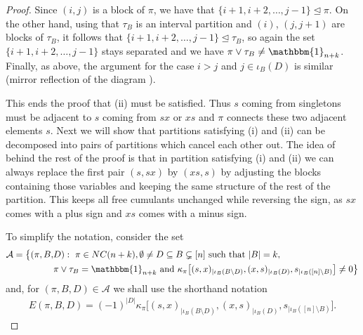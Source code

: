 \documentclass{amsart}
\begin{document}
\begin{proof}
    
    Since $ (i, j) $ is a block of $\pi $, we have that 
     $ \{ i+1, i+2, \dots, j-1\} \trianglelefteq \pi$. 
     On the other hand, using that $ \tau_B $ is an interval partition and $ (i)$, $(j, j+1)$ are blocks of $ \tau_B $, it follows that 
     $\{ i+1, i+2, \dots, j-1\} \trianglelefteq \tau_B$, so
     again the set $\{ i+1, i+2, \dots, j-1\}$ stays separated and we have $ \pi\vee \tau_B \neq \mathbbm{1}_{n+k}$. Finally, as above, the argument for the case 
     $ i > j $ and $ j \in \iota_B( D)$
     is similar (mirror reflection of the diagram ).
     
     This ends the proof that (ii) must be satisfied. Thus $s$ coming from singletons must be adjacent to $s$ coming from $sx$ or $xs$ and $\pi$ connects these two adjacent elements $s$.  Next we will show that partitions satisfying (i) and (ii) can be decomposed into pairs of partitions which cancel each other out. The idea of behind the rest of the proof is that in partition satisfying (i) and (ii) we can always replace the first pair $(s,sx)$ by $(xs,s)$ by adjusting the blocks containing those variables and keeping the same structure of the rest of the partition. This keeps all free cumulants unchanged while reversing the sign, as $sx$ comes with a plus sign and $xs$ comes with a minus sign.
     
     To simplify the notation, consider the set
     \begin{align*}
     \mathcal{A} = \big\{  (\pi, B, & D):\ \pi \in NC(n+k), \emptyset \neq D \subseteq B \subsetneq [n] \textrm{ such that } | B | = k,\\
     & \pi \vee\tau_B = \mathbbm{1}_{n+k} 
     \textrm{ and } \kappa_{\pi} \big[ 
     (s, x)_{ | \iota_B (B \setminus D)} , (x, s)_{| \iota_B (D)} , s_{| \iota_B ([n] \setminus B )}\big]
      \neq 0\big\}
     \end{align*}
 and, for $(\pi, B, D) \in \mathcal{A} $ we shall use the shorthand notation 
 \begin{align*}
 E(\pi, B, D)= (-1)^{| D|} \kappa_{\pi} \big[ 
 (s, x)_{ | \iota_B (B \setminus D)} , (x, s)_{| \iota_B (D)} , s_{| \iota_B ([n] \setminus B )}\big].
 \end{align*}
 

\end{proof}
\end{document}
